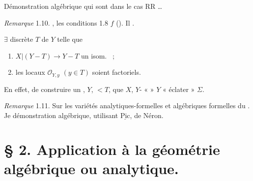 \documentclass[11pt,a4paper]{article}
\begin{document}

Démonstration algébrique  \ill{}  qui sont dans le cas     RR  …

\emph{Remarque} 1.10.  \ill{} \ill{}, \ill{} les conditions 1.8  \ill{} \ill{} \ill{} \ill{} \ill{} $f$ \ill{}  (). Il \ill{} \ill{}   \ill{} \ill{} \ill{} .

$\exists$  discrète $T$ de $Y$ telle que
\begin{enumerate}
  \item[a)] $X|(Y-T) \to Y-T$   un isom.\ \ill{} ;
  \item[b)] les  locaux $\mathcal{O}_{Y,y}$ $(y \in T)$ soient factoriels.
\end{enumerate}

En effet, \ill{} \ill{} \ill{} \ill{} \ill{} \ill{}  de construire un \ill{} \ill{}, \ill{} \struck{\ill{}}  \ill{} \ill{} $Y$, \emph{ \ill{} $< T$},  que $X$,  $Y$- \ill{} \ill{}  \ill{}  «  » \ill{} $Y$ \ill{} \ill{}  \ill{} « éclater » $\Sigma$.

\emph{Remarque} 1.11. Sur les variétés analytiques-formelles et algébriques formelles du \ill{} . Je \ill{}     démonstration  algébrique, utilisant $\underline{\mathrm{Pic}}$, \struck{\ill{}}  \ill{} de Néron.

\section*{§ 2. Application à la géométrie algébrique ou analytique.}
\end{document}

